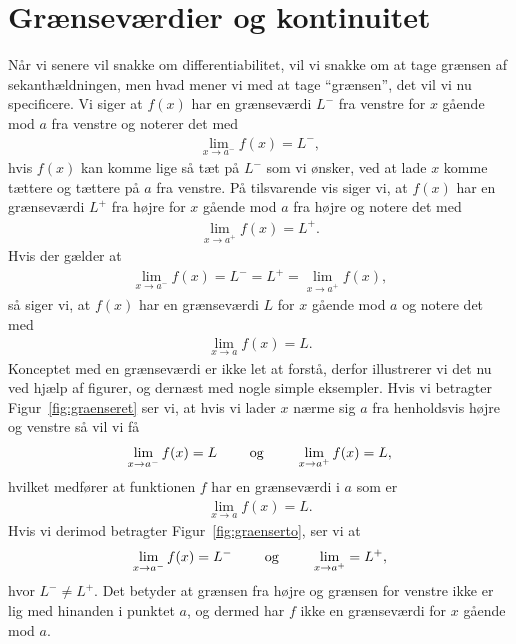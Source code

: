 \section{Grænseværdier og kontinuitet}
\noindent Når vi senere vil snakke om differentiabilitet, vil vi snakke om at tage grænsen af sekanthældningen, men hvad mener vi med at tage ``grænsen'', det vil vi nu specificere. Vi siger at $f(x)$ har en grænseværdi $L^-$ fra venstre for $x$ gående mod $a$ fra venstre og noterer det med
\begin{align*}
\lim_{x \to a^-} f(x) = L^-,
\end{align*}
hvis $f(x)$ kan komme lige så tæt på $L^-$ som vi ønsker, ved at lade $x$ komme tættere og tættere på $a$ fra venstre. På tilsvarende vis siger vi, at $f(x)$ har en grænseværdi $L^+$ fra højre for $x$ gående mod $a$ fra højre og notere det med 
\begin{align*}
\lim_{x \to a^+} f(x) = L^+.
\end{align*}
Hvis der gælder at 
\begin{align*}
\lim_{x \to a^-} f(x)=L^-=L^+=\lim_{x \to a^+} f(x),
\end{align*}
så siger vi, at $f(x)$ har en grænseværdi $L$ for $x$ gående mod $a$ og notere det med
\begin{align*}
\lim_{x \to a } f(x) =L.
\end{align*}
Konceptet med en grænseværdi er ikke let at forstå, derfor illustrerer vi det nu ved hjælp af figurer, og dernæst med nogle simple eksempler. Hvis vi betragter Figur~\ref{fig:graenseret} ser vi, at hvis vi lader $x$ nærme sig $a$ fra henholdsvis højre og venstre så vil vi få
\begin{align*}
\lim_{x \to a^-} f(x)=L \qquad \textup{ og } \qquad \lim_{x \to a^+} f(x)=L,
\end{align*}
hvilket medfører at funktionen $f$ har en grænseværdi i $a$ som er
\begin{align*}
\lim_{x \to a} f(x) =L.
\end{align*}
Hvis vi derimod betragter Figur~\ref{fig:graenserto}, ser vi at 
\begin{align*}
\lim_{x \to a^-} f(x)=L^- \qquad \textup{ og } \qquad \lim_{x \to a^+}=L^+,
\end{align*}
hvor $L^- \neq L^+$. Det betyder at grænsen fra højre og grænsen for venstre ikke er lig med hinanden i punktet $a$, og dermed har $f$ ikke en grænseværdi for $x$ gående mod $a$.

